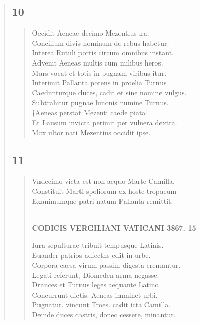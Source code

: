 \documentclass[11pt, a4paper]{report}
\begin{document}
\begin{verse}
  \subsection*{10}
      \begin{verse}
      Occidit Aeneae decimo Mezentius ira. \\ Concilium divis hominum de rebus habetur. \\ Interea Rutuli portis circum omnibus instant. \\ Advenit Aeneas multis cum milibus heros. \\ Mars vocat et totis in pugnam viribus itur. \\ Interimit Pallanta potens in proelia Turnus \\ Caedunturque duces, cadit et sine nomine vulgus. \\ Subtrahitur pugnae lunonis numine Turnus. \\ †Aeneas perstat Mezenti caede piata† \\ Et Lausum invicta perimit per vulnera dextra. \\ Mox ultor nati Mezentius occidit ipse. \\ 
      \end{verse}
  \subsection*{11}
      \begin{verse}
      Vndecimo victa est non aequo Marte Camilla. \\ Constituit Marti spoliorum ex hoste tropaeum \\ Exanimumque patri natum Pallanta remittit. \\ 
        ﻿\pagebreak 
    \begin{center} \textbf{CODICIS VERGILIANI VATICANI 3867. 15} \end{center}Iura sepulturae tribuit tempusque Latinis. \\ Euander patrios adfectns edit in urbe. \\ Corpora caesa virum passim digesta cremantur. \\ Legati referunt, Diomeden arma negasse. \\ Drances et Turnus leges aequante Latino \\ Concurrunt dictis. Aeneas imminet urbi. \\ Pugnatur. vincunt Troes. cadit icta Camilla. \\ Deinde duces castris, donec cessere, minantur. \\ 
      \end{verse}

\end{verse}
\end{document}
